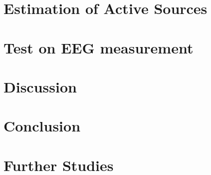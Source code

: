 % 


\pagestyle{empty} %




\cleardoublepage

\pagestyle{fancy} %


\cleardoublepage
%

\tableofcontents










\chapter{Estimation of Active Sources}
\chapter{Test on EEG measurement}
\chapter{Discussion}
\chapter{Conclusion}
\chapter{Further Studies}


\printbibliography[heading=bibintoc, title=Bibliography]
\label{bib:mybiblio}

\appendix


%

